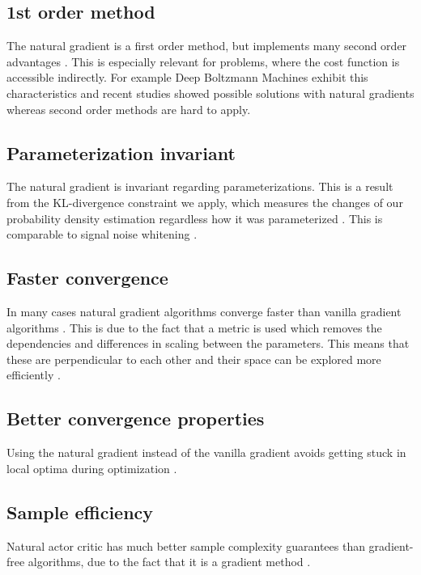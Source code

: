 \subsection{1st order method}
The natural gradient is a first order method, but implements many second order advantages \cite{pascanu2013revisiting}. This is especially relevant for problems, where the cost function is accessible indirectly. For example Deep Boltzmann Machines exhibit this characteristics and recent studies showed possible solutions with natural gradients \cite{desjardins2013metric} whereas second order methods are hard to apply.

\subsection{Parameterization invariant}
The natural gradient is invariant regarding parameterizations. This is a result from the KL-divergence constraint we apply, which measures the changes of our probability density estimation regardless how it was parameterized \cite{pascanu2013revisiting}. This is comparable to signal noise whitening \cite{sohl2012natural}.

\subsection{Faster convergence}
In many cases natural gradient algorithms converge faster than vanilla gradient algorithms \cite{sohl2012natural, amari1998natural}. This is due to the fact that a metric is used which removes the dependencies and differences in scaling between the parameters. This means that these are perpendicular to each other and their space can be explored more efficiently \cite{sohl2012natural}.

\subsection{Better convergence properties}
Using the natural gradient instead of the vanilla gradient avoids getting stuck in local optima during optimization \cite{amari1998natural}.

\subsection{Sample efficiency}
Natural actor critic has much better sample complexity guarantees than gradient-free algorithms, due to the fact that it is a gradient method \cite{nemirovski2005efficient}.


